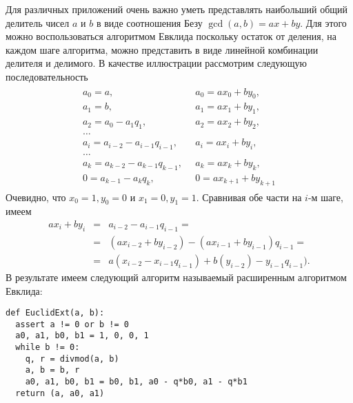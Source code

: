 \documentclass[14pt]{extreport}
\begin{document}
Для различных приложений очень важно уметь представлять
наибольший общий делитель чисел $a$ и $b$ в виде соотношения
Безу $\gcd(a, b) = ax+by$. Для этого можно воспользоваться
алгоритмом Евклида поскольку остаток от деления, на
каждом шаге алгоритма, можно представить в виде линейной
комбинации делителя и делимого. В качестве иллюстрации
рассмотрим  следующую последовательность
\begin{eqnarray*}
\begin{array}{ll}
a_0 = a, & a_0 = a x_0 + b y_0, \\
a_1 = b, & a_1 = a x_1 + b y_1, \\
a_2 = a_0 - a_1 q_1, & a_2 = a x_2 + b y_2, \\
\ldots & \\
a_i = a_{i-2} - a_{i-1} q_{i-1}, \quad & a_i = a x_i + b y_i, \\
\ldots & \\
a_k = a_{k-2} - a_{k-1} q_{k-1}, & a_k = a x_k + b y_k, \\
0 = a_{k-1} - a_{k} q_{k}, & 0 = a x_{k+1} + b y_{k+1}
\end{array}
\end{eqnarray*}
Очевидно, что $x_0 = 1, y_0 = 0$ и $x_1 = 0, y_1 = 1$. Сравнивая
обе части на $i$-м шаге, имеем
\begin{eqnarray*}
 a x_i + b y_i &=& a_{i-2} - a_{i-1} q_{i-1} = \\
       &=& (a x_{i-2} + b y_{i-2}) - (a x_{i-1} + b y_{i-1}) q_{i-1} = \\
   &=& a (x_{i-2} - x_{i-1} q_{i-1})
     + b (y_{i-2}) - y_{i-1} q_{i-1}).
\end{eqnarray*}
В результате имеем следующий алгоритм называемый
расширенным алгоритмом Евклида:
\begin{Verbatim}[fontsize=\small,frame=leftline]
def EuclidExt(a, b):
  assert a != 0 or b != 0
  a0, a1, b0, b1 = 1, 0, 0, 1
  while b != 0:
    q, r = divmod(a, b)
    a, b = b, r
    a0, a1, b0, b1 = b0, b1, a0 - q*b0, a1 - q*b1
  return (a, a0, a1)
\end{Verbatim}
\end{document}
